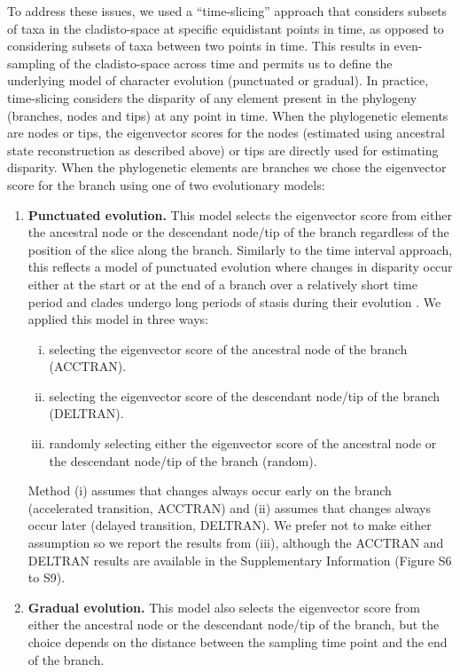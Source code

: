 \documentclass[12pt,letterpaper]{article}
\begin{document}
To address these issues, we used a ``time-slicing'' approach that considers subsets of taxa in the cladisto-space at specific equidistant points in time, as opposed to considering subsets of taxa between two points in time.
This results in even-sampling of the cladisto-space across time and permits us to define the underlying model of character evolution (punctuated or gradual).  
In practice, time-slicing considers the disparity of any element present in the phylogeny (branches, nodes and tips) at any point in time.
When the phylogenetic elements are nodes or tips, the eigenvector scores for the nodes (estimated using ancestral state reconstruction as described above) or tips are directly used for estimating disparity.
When the phylogenetic elements are branches we chose the eigenvector score for the branch using one of two evolutionary models:
\begin{enumerate}
    \item{\textbf{Punctuated evolution.}} 
    This model selects the eigenvector score from either the ancestral node or the descendant node/tip of the branch regardless of the position of the slice along the branch. 
    Similarly to the time interval approach, this reflects a model of punctuated evolution where changes in disparity occur either at the start or at the end of a branch over a relatively short time period and clades undergo long periods of stasis during their evolution \citep{Gould1977,Hunt20112007}.
    We applied this model in three ways: 
    \begin{enumerate}[(i)]
      \item selecting the eigenvector score of the ancestral node of the branch (ACCTRAN).
      \item selecting the eigenvector score of the descendant node/tip of the branch (DELTRAN).
      \item randomly selecting either the eigenvector score of the ancestral node or the descendant node/tip of the branch (random).
    \end{enumerate}
    Method (i) assumes that changes always occur early on the branch (accelerated transition, ACCTRAN) and (ii) assumes that changes always occur later (delayed transition, DELTRAN).
    We prefer not to make either assumption so we report the results from (iii), although the ACCTRAN and DELTRAN results are available in the Supplementary Information (Figure S6 to S9).
    \item{\textbf{Gradual evolution.}}
    This model also selects the eigenvector score from either the ancestral node or the descendant node/tip of the branch, but the choice depends on the distance between the sampling time point and the end of the branch.

\end{enumerate}
\end{document}
